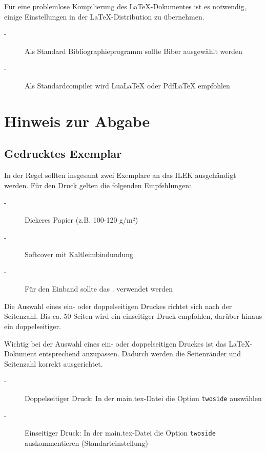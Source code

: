 \doublespacing
Für eine problemlose Kompilierung des \LaTeX-Dokumentes ist es notwendig, einige Einstellungen in der LaTeX-Distribution zu übernehmen.

\begin{description}
	\item[-] Als Standard Bibliographieprogramm sollte Biber ausgewählt werden
	\item[-] Als Standardcompiler wird LuaLaTeX oder PdfLaTeX empfohlen
\end{description}

\newpage

\section*{Hinweis zur Abgabe}

\subsection*{Gedrucktes Exemplar}

In der Regel sollten insgesamt zwei Exemplare an das ILEK ausgehändigt werden. Für den Druck gelten die folgenden Empfehlungen:

\begin{description}
	\item[-] Dickeres Papier (z.B. 100-120 g/m²)
	\item[-] Softcover mit Kaltleimbindundung
	\item[-] Für den Einband sollte das . verwendet werden 
\end{description}

Die Auswahl eines ein- oder doppelseitigen Druckes richtet sich nach der Seitenzahl. Bis ca. 50 Seiten wird ein einseitiger Druck empfohlen, darüber hinaus ein doppelseitiger.

Wichtig bei der Auswahl eines ein- oder doppelseitigen Druckes ist das LaTeX-Dokument entsprechend anzupassen. Dadurch werden die Seitenränder und Seitenzahl korrekt ausgerichtet.

\begin{description}
	\item[-] Doppelseitiger Druck: In der main.tex-Datei die Option \lstinline[basicstyle=\ttfamily]|twoside| auswählen
	\item[-] Einseitiger Druck: In der main.tex-Datei die Option \lstinline[basicstyle=\ttfamily]|twoside| auskommentieren (Standarteinstellung)
\end{description}

